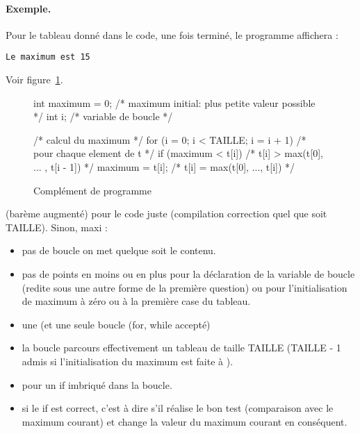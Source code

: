   \paragraph{Exemple.} Pour le tableau donné dans le code, une fois
  terminé, le programme affichera :

\begin{small}
\begin{verbatim}
Le maximum est 15
\end{verbatim}
\end{small}

\begin{correction}
Voir figure~\ref{fig:maxcorr}.
  \begin{figure}[htbp]
\small
  \begin{listing}{11}
    int maximum = 0; /* maximum initial: plus petite valeur possible */    
    int i; /* variable de boucle */

    /* calcul du maximum */
    for (i = 0; i < TAILLE; i = i + 1) /* pour chaque element de t */    
    {
        if (maximum < t[i]) /* t[i] > max(t[0], ... , t[i - 1]) */
        {
            maximum = t[i]; /* t[i] = max(t[0], ..., t[i]) */ 
        }
    }
  \end{listing}
   \caption{Complément de programme}
    \label{fig:maxcorr}
  \end{figure}

\begin{baremeenv}
  (barème augmenté)  pour le code juste (compilation correction quel que soit
  TAILLE). Sinon, maxi  :
  \begin{itemize}
  \item pas de boucle on met  quelque soit le contenu.
  \item pas de points en moins ou en plus pour la déclaration de la
    variable de boucle (redite sous une autre forme de la première
    question) ou pour l'initialisation de maximum à zéro ou à la
    première case du tableau.
  \item {} une (et une seule boucle (for, while accepté)
 \item {} la boucle parcours effectivement un tableau de taille
    TAILLE (TAILLE - 1 admis si l'initialisation du maximum est faite à ).
\item {} pour un if imbriqué dans la boucle.
\item {} si le if est correct, c'est à dire s'il réalise le bon test (comparaison avec le maximum
  courant) et change la valeur du maximum courant en conséquent.
  \end{itemize}
\end{baremeenv}
\end{correction}



